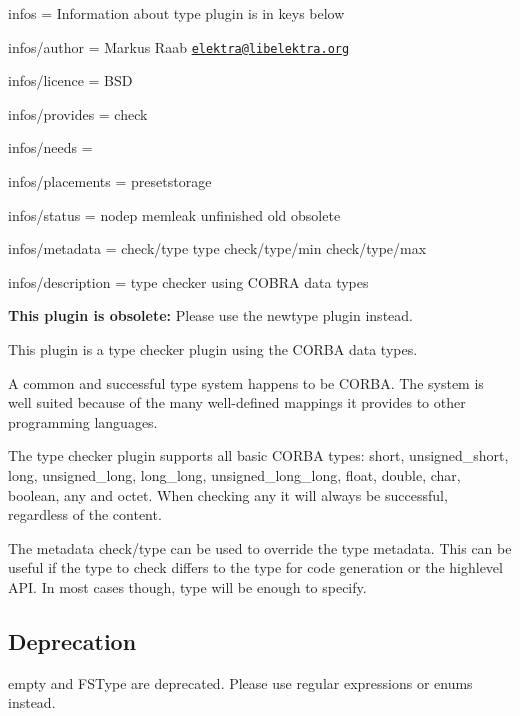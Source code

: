 
\begin{DoxyItemize}
\item infos = Information about type plugin is in keys below
\item infos/author = Markus Raab \href{mailto:elektra@libelektra.org}{\tt elektra@libelektra.\+org}
\item infos/licence = B\+SD
\item infos/provides = check
\item infos/needs =
\item infos/placements = presetstorage
\item infos/status = nodep memleak unfinished old obsolete
\item infos/metadata = check/type type check/type/min check/type/max
\item infos/description = type checker using C\+O\+B\+RA data types
\end{DoxyItemize}

{\bfseries This plugin is obsolete\+:} Please use the {\ttfamily newtype} plugin instead.

This plugin is a type checker plugin using the {\ttfamily C\+O\+R\+BA} data types.

A common and successful type system happens to be C\+O\+R\+BA. The system is well suited because of the many well-\/defined mappings it provides to other programming languages.

The type checker plugin supports all basic C\+O\+R\+BA types\+: {\ttfamily short}, {\ttfamily unsigned\+\_\+short}, {\ttfamily long}, {\ttfamily unsigned\+\_\+long}, {\ttfamily long\+\_\+long}, {\ttfamily unsigned\+\_\+long\+\_\+long}, {\ttfamily float}, {\ttfamily double}, {\ttfamily char}, {\ttfamily boolean}, {\ttfamily any} and {\ttfamily octet}. When checking {\ttfamily any} it will always be successful, regardless of the content.

The metadata {\ttfamily check/type} can be used to override the {\ttfamily type} metadata. This can be useful if the type to check differs to the type for code generation or the highlevel A\+PI. In most cases though, {\ttfamily type} will be enough to specify.

\subsection*{Deprecation}

{\ttfamily empty} and {\ttfamily F\+S\+Type} are deprecated. Please use regular expressions or enums instead.

